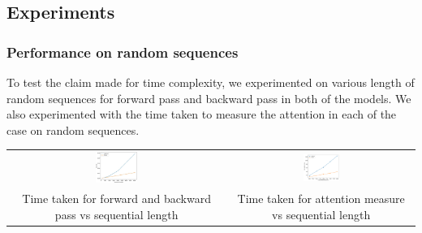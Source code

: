 \documentclass{article}
\begin{document}
\subsection{Experiments}
\subsubsection{Performance on random sequences}

To test the claim made for time complexity, we experimented on various length of random sequences for forward pass and backward pass in both of the models. We also experimented with the time taken to measure the attention in each of the case on random sequences.
\begin{center}
    \begin{tabular}{c c}
         \includegraphics[width=0.2\textwidth]{images/forwardpassandbackwardpass.jpg} &
         \includegraphics[width=0.2\textwidth]{images/attentiontimemeasure.png}\\
         Time taken for forward and backward pass vs sequential length & Time taken for attention measure vs sequential length
    \end{tabular}
\end{center}
\end{document}
